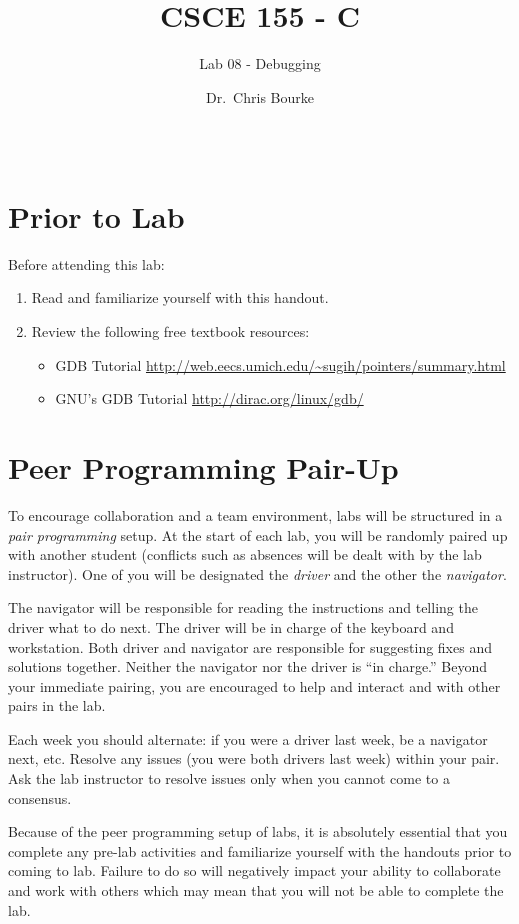 \documentclass[12pt]{scrartcl}
\title{CSCE 155 - C}
\subtitle{Lab 08 - Debugging}
\author{Dr.\ Chris Bourke}
\date{~}
\begin{document}
\maketitle

\section*{Prior to Lab}

Before attending this lab:
\begin{enumerate}
  \item Read and familiarize yourself with this handout.
  \item Review the following free textbook resources:
	\begin{itemize}
  	  \item GDB Tutorial \url{http://web.eecs.umich.edu/~sugih/pointers/summary.html} 
	  \item GNU's GDB Tutorial \url{http://dirac.org/linux/gdb/}
	\end{itemize}
\end{enumerate}

\section*{Peer Programming Pair-Up}

To encourage collaboration and a team environment, labs will be
structured in a \emph{pair programming} setup.  At the start of
each lab, you will be randomly paired up with another student 
(conflicts such as absences will be dealt with by the lab instructor).
One of you will be designated the \emph{driver} and the other
the \emph{navigator}.  

The navigator will be responsible for reading the instructions and
telling the driver what to do next.  The driver will be in charge of the
keyboard and workstation.  Both driver and navigator are responsible
for suggesting fixes and solutions together.  Neither the navigator
nor the driver is ``in charge.''  Beyond your immediate pairing, you
are encouraged to help and interact and with other pairs in the lab.

Each week you should alternate: if you were a driver last week, 
be a navigator next, etc.  Resolve any issues (you were both drivers
last week) within your pair.  Ask the lab instructor to resolve issues
only when you cannot come to a consensus.  

Because of the peer programming setup of labs, it is absolutely 
essential that you complete any pre-lab activities and familiarize
yourself with the handouts prior to coming to lab.  Failure to do
so will negatively impact your ability to collaborate and work with 
others which may mean that you will not be able to complete the
lab.  
\end{document}
